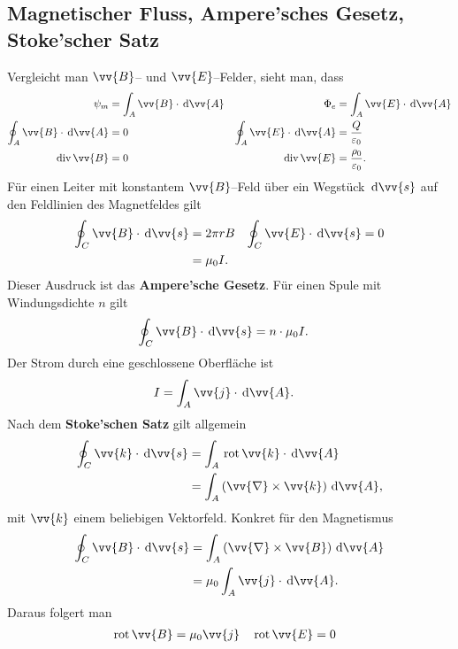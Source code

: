 \documentclass[a4paper,12pt]{article}
\newcommand{\td}{\,\text{d}}
\begin{document}
\subsection{Magnetischer Fluss, Ampere'sches Gesetz, Stoke'scher Satz}
Vergleicht man $\vv{B}$-- und $\vv{E}$--Felder, sieht man, dass
\begin{align*}
        \psi _m&=\int_{A}^{}\vv{B}\cdot \td \vv{A}&\Phi _e&=\int_{A}^{}\vv{E}\cdot \td \vv{A}\\
        \oint_{A}^{}\vv{B}\cdot \td \vv{A}&=0&\oint_{A}^{}\vv{E}\cdot \td \vv{A}&=\dfrac{Q}{\varepsilon _0}\\
        \,\text{div}\,\vv{B}&=0&\,\text{div}\,\vv{E}&=\dfrac{\rho _0}{\varepsilon _0}
.\end{align*}
Für einen Leiter mit konstantem $\vv{B}$--Feld über ein Wegstück $\td \vv{s}$ auf den Feldlinien des Magnetfeldes gilt
\begin{align*}
        \oint_{C}^{}\vv{B}\cdot \td \vv{s}&=2\pi rB&\oint_{C}^{}\vv{E}\cdot \td \vv{s}&=0\\
                                          &=\mu _0I
.\end{align*}
Dieser Ausdruck ist das \textbf{Ampere'sche Gesetz}. Für einen Spule mit Windungsdichte $n$ gilt
\begin{align} 
        \oint_{C}^{}\vv{B}\cdot \td \vv{s}&=n\cdot \mu _0I
.\end{align} 
Der Strom durch eine geschlossene Oberfläche ist
\begin{align*}
        I&=\int_{A}^{}\vv{j}\cdot \td \vv{A}
.\end{align*}
Nach dem \textbf{Stoke'schen Satz} gilt allgemein
\begin{align*}
        \oint_{C}^{}\vv{k}\cdot \td \vv{s}&=\int_{A}^{}\,\text{rot}\,\vv{k}\cdot \td \vv{A}\\
                                          &=\int_{A}^{}\left(\vv{\nabla }\times \vv{k}\right)\td \vv{A}
,\end{align*}
mit $\vv{k}$ einem beliebigen Vektorfeld. Konkret für den Magnetismus
\begin{align*}
        \oint_{C}^{}\vv{B}\cdot \td \vv{s}&=\int_{A}^{}\left(\vv{\nabla }\times \vv{B}\right)\td \vv{A}\\
                                          &=\mu _0\int_{A}^{}\vv{j}\cdot \td \vv{A}
.\end{align*}
Daraus folgert man
\begin{align*}
        \,\text{rot}\,\vv{B}&=\mu _0\vv{j}&\,\text{rot}\,\vv{E}&=0
\end{align*}
\end{document}
